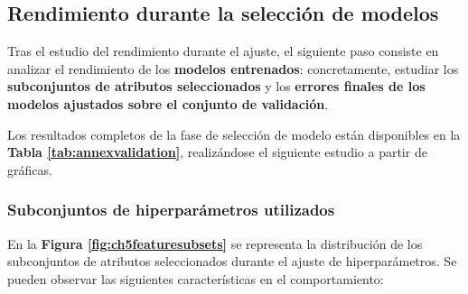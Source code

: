 \subsection{Rendimiento durante la selección de modelos}

Tras el estudio del rendimiento durante el ajuste, el siguiente paso consiste en analizar el rendimiento de los \textbf{modelos entrenados}: concretamente, estudiar los \textbf{subconjuntos de atributos seleccionados} y los \textbf{errores finales de los modelos ajustados sobre el conjunto de validación}.

Los resultados completos de la fase de selección de modelo están disponibles en la \textbf{Tabla \ref{tab:annexvalidation}}, realizándose el siguiente estudio a partir de gráficas.

\subsubsection{Subconjuntos de hiperparámetros utilizados}

En la \textbf{Figura \ref{fig:ch5featuresubsets}} se representa la distribución de los subconjuntos de atributos seleccionados durante el ajuste de hiperparámetros. Se pueden observar las siguientes características en el comportamiento:

